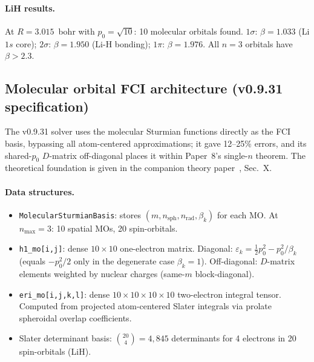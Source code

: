 \documentclass[aps,pra,twocolumn,superscriptaddress,longbibliography,floatfix]{revtex4-2}
\begin{document}
\paragraph{LiH results.}
At $R = 3.015$~bohr with $p_0 = \sqrt{10}$: 10 molecular orbitals
found.  $1\sigma$: $\beta = 1.033$ (Li $1s$ core);
$2\sigma$: $\beta = 1.950$ (Li-H bonding);
$1\pi$: $\beta = 1.976$.  All $n=3$ orbitals have $\beta > 2.3$.


\subsection{Molecular orbital FCI architecture (v0.9.31 specification)}
\label{sec:mo_fci_spec}

The v0.9.31 solver uses the molecular Sturmian functions directly as
the FCI basis, bypassing all atom-centered approximations; it gave
12--25\% errors, and its shared-$p_0$ $D$-matrix off-diagonal places it
within Paper~8's single-$n$ theorem.  The theoretical foundation is given in the companion theory
paper~\cite{loutey_bond_sphere_sturmian}, Sec.~X.

\paragraph{Data structures.}
\begin{itemize}
\item \texttt{MolecularSturmianBasis}: stores $(m, n_{\text{sph}},
n_{\text{rad}}, \beta_k)$ for each MO.  At $n_{\max} = 3$:
10 spatial MOs, 20 spin-orbitals.

\item \texttt{h1\_mo[i,j]}: dense $10 \times 10$ one-electron matrix.
Diagonal: $\varepsilon_k = \tfrac12 p_0^2 - p_0^2/\beta_k$ (equals
$-p_0^2/2$ only in the degenerate case $\beta_k=1$).  Off-diagonal:
$D$-matrix elements weighted by nuclear charges (same-$m$ block-diagonal).

\item \texttt{eri\_mo[i,j,k,l]}: dense $10 \times 10 \times 10 \times 10$
two-electron integral tensor.  Computed from projected atom-centered
Slater integrals via prolate spheroidal overlap coefficients.

\item Slater determinant basis: $\binom{20}{4} = 4{,}845$ determinants
for 4 electrons in 20 spin-orbitals (LiH).
\end{itemize}
\end{document}
